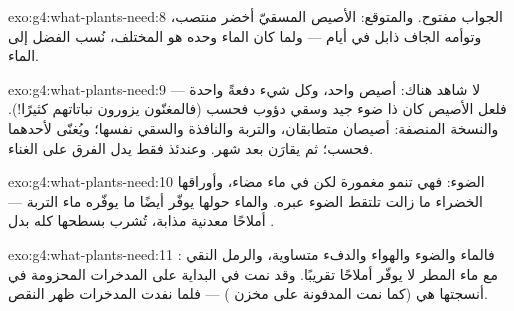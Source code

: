 \begin{solution}{exo:g4:what-plants-need:8}
الجواب مفتوح. والمتوقع: الأصيص المسقيّ أخضر منتصب، وتوأمه الجاف
ذابل في أيام --- ولما كان الماء وحده هو المختلف، نُسب الفضل إلى
الماء.
\end{solution}

\begin{solution}{exo:g4:what-plants-need:9}
لا شاهد هناك: أصيص واحد، وكل شيء دفعةً واحدة --- فلعل الأصيص كان
ذا ضوء جيد وسقي دؤوب فحسب (فالمغنّون يزورون نباتاتهم كثيرًا!).
والنسخة المنصفة: أصيصان متطابقان،  والتربة والنافذة والسقي
نفسها؛ ويُغنّى لأحدهما فحسب؛ ثم يقارَن بعد شهر. وعندئذ فقط يدل
الفرق على الغناء.
\end{solution}

\begin{solution}{exo:g4:what-plants-need:10}
الضوء: فهي تنمو مغمورة لكن في ماء مضاء، وأوراقها الخضراء ما زالت
تلتقط الضوء عبره. والماء حولها يوفّر أيضًا ما يوفّره ماء التربة ---
أملاحًا معدنية مذابة، تُشرب بسطحها كله بدل .
\end{solution}

\begin{solution}{exo:g4:what-plants-need:11}
: فالماء والضوء والهواء والدفء متساوية، والرمل
النقي مع ماء المطر لا يوفّر أملاحًا تقريبًا. وقد نمت في البداية على
المدخرات المحزومة في أنسجتها هي (كما نمت  المدفونة على مخزن
) --- فلما نفدت المدخرات ظهر النقص.
\end{solution}

